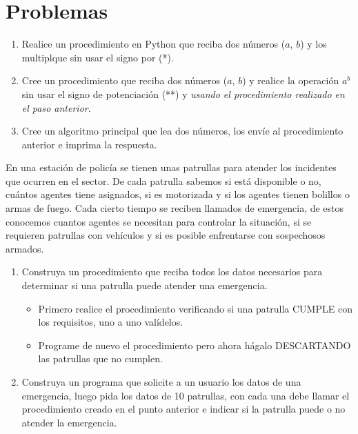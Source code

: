 \section{Problemas}
\begin{Exercise}[title={Calentamiento}]	
	\begin{enumerate}
		\item Realice un procedimiento en Python que reciba dos números ($a$, $b$) y los multiplque sin usar el signo por (*).
		
		\item Cree un procedimiento que reciba dos números ($a$, $b$) y realice la operación $a^b$ sin usar el signo de potenciación (**) y \emph{usando el procedimiento realizado en el paso anterior}.
		
		\item Cree un algoritmo principal que lea dos números, los envíe al procedimiento anterior e imprima la respuesta.
	\end{enumerate}
\end{Exercise}
\begin{Answer}
	
	
	\newpage
\end{Answer}
\newpage
\begin{Exercise}[title={Patrullas de policía}]	
	En una estación de policía se tienen unas patrullas para atender los incidentes
	que ocurren en el sector. De cada patrulla sabemos si está disponible o no, cuántos
	agentes tiene asignados, si es motorizada y si los agentes tienen bolillos o armas de
	fuego. Cada cierto tiempo se reciben llamados de emergencia, de estos conocemos
	cuantos agentes se necesitan para controlar la situación, si se requieren patrullas con
	vehículos y si es posible enfrentarse con sospechosos armados.
	
	\begin{enumerate}
		\item Construya un procedimiento que reciba todos los datos necesarios para
		determinar si una patrulla puede atender una emergencia.
		
		\begin{itemize}
			\item Primero realice el procedimiento verificando si una patrulla CUMPLE con los requisitos, uno a uno valídelos.
			
			\item Programe de nuevo el procedimiento pero ahora hágalo DESCARTANDO las patrullas que no cumplen.
			
		\end{itemize}
		
		\item Construya un programa que solicite a un usuario los datos de una
		emergencia, luego pida los datos de 10 patrullas, con cada una
		debe llamar el procedimiento creado en el punto anterior e indicar si la patrulla puede o no atender la emergencia.
	\end{enumerate}
\end{Exercise}
\begin{Answer}
	
	
	\newpage
\end{Answer}


